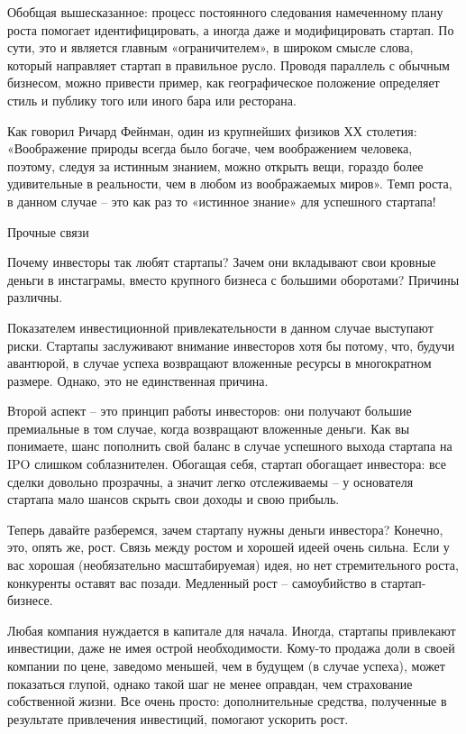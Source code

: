 \documentclass[ebook,12pt,oneside,openany]{memoir}
\begin{document}
Обобщая вышесказанное: процесс постоянного следования намеченному
плану роста помогает идентифицировать, а иногда даже и модифицировать
стартап. По сути, это и является главным «ограничителем», в широком
смысле слова, который направляет стартап в правильное русло. Проводя
параллель с обычным бизнесом, можно привести пример, как
географическое положение определяет стиль и публику того или иного
бара или ресторана.

Как говорил Ричард Фейнман, один из крупнейших физиков ХХ столетия:
«Воображение природы всегда было богаче, чем воображением человека,
поэтому, следуя за истинным знанием, можно открыть вещи, гораздо более
удивительные в реальности, чем в любом из воображаемых миров». Темп
роста, в данном случае – это как раз то «истинное знание» для
успешного стартапа!

Прочные связи

Почему инвесторы так любят стартапы? Зачем они вкладывают свои кровные
деньги в инстаграмы, вместо крупного бизнеса с большими оборотами?
Причины различны.

Показателем инвестиционной привлекательности в данном случае выступают
риски. Стартапы заслуживают внимание инвесторов хотя бы потому, что,
будучи авантюрой, в случае успеха возвращают вложенные ресурсы в
многократном размере. Однако, это не единственная причина.

Второй аспект – это принцип работы инвесторов: они получают большие
премиальные в том случае, когда возвращают вложенные деньги. Как вы
понимаете, шанс пополнить свой баланс в случае успешного выхода
стартапа на IPO слишком соблазнителен. Обогащая себя, стартап
обогащает инвестора: все сделки довольно прозрачны, а значит легко
отслеживаемы – у основателя стартапа мало шансов скрыть свои доходы и
свою прибыль.

Теперь давайте разберемся, зачем стартапу нужны деньги инвестора?
Конечно, это, опять же, рост. Связь между ростом и хорошей идеей очень
сильна. Если у вас хорошая (необязательно масштабируемая) идея, но нет
стремительного роста, конкуренты оставят вас позади. Медленный рост –
самоубийство в стартап-бизнесе.

Любая компания нуждается в капитале для начала. Иногда, стартапы
привлекают инвестиции, даже не имея острой необходимости. Кому-то
продажа доли в своей компании по цене, заведомо меньшей, чем в будущем
(в случае успеха), может показаться глупой, однако такой шаг не менее
оправдан, чем страхование собственной жизни. Все очень просто:
дополнительные средства, полученные в результате привлечения
инвестиций, помогают ускорить рост.
\end{document}
